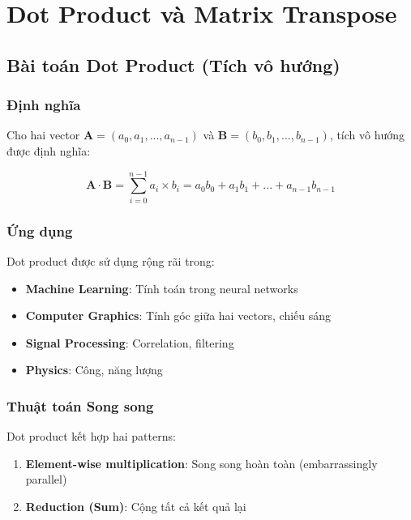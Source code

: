 \chapter{Dot Product và Matrix Transpose}
\label{chap:dot_transpose}

\section{Bài toán Dot Product (Tích vô hướng)}

\subsection{Định nghĩa}

Cho hai vector $\mathbf{A} = (a_0, a_1, ..., a_{n-1})$ và $\mathbf{B} = (b_0, b_1, ..., b_{n-1})$, tích vô hướng được định nghĩa:

\begin{equation}
\mathbf{A} \cdot \mathbf{B} = \sum_{i=0}^{n-1} a_i \times b_i = a_0 b_0 + a_1 b_1 + ... + a_{n-1} b_{n-1}
\end{equation}

\subsection{Ứng dụng}

Dot product được sử dụng rộng rãi trong:
\begin{itemize}
    \item \textbf{Machine Learning}: Tính toán trong neural networks
    \item \textbf{Computer Graphics}: Tính góc giữa hai vectors, chiếu sáng
    \item \textbf{Signal Processing}: Correlation, filtering
    \item \textbf{Physics}: Công, năng lượng
\end{itemize}

\subsection{Thuật toán Song song}

Dot product kết hợp hai patterns:
\begin{enumerate}
    \item \textbf{Element-wise multiplication}: Song song hoàn toàn (embarrassingly parallel)
    \item \textbf{Reduction (Sum)}: Cộng tất cả kết quả lại
\end{enumerate}

